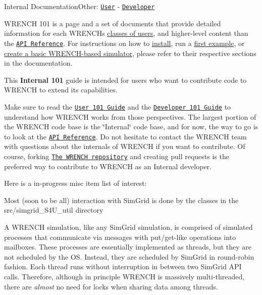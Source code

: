 Internal DocumentationOther\+: \href{../user/wrench-101.html}{\tt User} -\/ \href{../developer/wrench-101.html}{\tt Developer}

W\+R\+E\+N\+CH 101 is a page and a set of documents that provide detailed information for each W\+R\+E\+N\+CH\textquotesingle{}s \hyperlink{index_overview-users}{classes of users}, and higher-\/level content than the \href{./annotated.html}{\tt A\+PI Reference}. For instructions on how to \hyperlink{install}{install}, run a \hyperlink{getting-started}{first example}, or \hyperlink{getting-started_getting-started-prep}{create a basic W\+R\+E\+N\+C\+H-\/based simulator}, please refer to their respective sections in the documentation.

This {\bfseries Internal 101} guide is intended for users who want to contribute code to W\+R\+E\+N\+CH to extend its capabilities. 



Make sure to read the \href{../user/wrench-101.html}{\tt User 101 Guide} and the \href{../developer/wrench-101.html}{\tt Developer 101 Guide} to understand how W\+R\+E\+N\+CH works from those perspectives. The largest portion of the W\+R\+E\+N\+CH code base is the \char`\"{}\+Internal\char`\"{} code base, and for now, the way to go is to look at the \href{./annotated.html}{\tt A\+PI Reference}. Do not hesitate to contact the W\+R\+E\+N\+CH team with questions about the internals of W\+R\+E\+N\+CH if you want to contribute. Of course, forking \href{http://github.com/wrench-project/wrench}{\tt The W\+R\+E\+N\+CH repository} and creating pull requests is the preferred way to contribute to W\+R\+E\+N\+CH as an Internal developer.

Here is a in-\/progress misc item list of interest\+:


\begin{DoxyItemize}
\item Most (soon to be all) interaction with Sim\+Grid is done by the classes in the {\ttfamily src/simgrid\+\_\+\+S4\+U\+\_\+util} directory
\item A W\+R\+E\+N\+CH simulation, like any Sim\+Grid simulation, is comprised of simulated processes that communicate via messages with put/get-\/like operations into mailboxes. These processes are essentially implemented as threads, but they are not scheduled by the OS. Instead, they are scheduled by Sim\+Grid in round-\/robin fashion. Each thread runs without interruption in between two Sim\+Grid A\+PI calls. Therefore, although in principle W\+R\+E\+N\+CH is massively multi-\/threaded, there are {\itshape almost} no need for locks when sharing data among threads. 
\end{DoxyItemize}